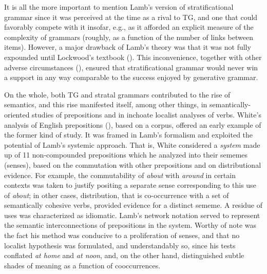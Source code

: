 \documentclass[english,output=paper,colorlinks,citecolor=brown]{../langscibook}
\begin{document}
It is all the more important to mention Lamb’s version of stratificational grammar since it was perceived at the time as a rival to TG, and one that could favorably compete with it insofar, e.g., as it afforded an explicit measure of the complexity of grammars (roughly, as a function of the number of links between items). However, a major drawback of Lamb’s theory was that it was not fully expounded until Lockwood’s textbook (\citealt{Lockwood1972}). This inconvenience, together with other adverse circumstances (\citealt{Nielsen2010}), ensured that stratificational grammar would never win a support in any way comparable to the success enjoyed by generative grammar.

On the whole, both TG and stratal grammars contributed to the rise of semantics, and this rise manifested itself, among other things, in semantically-oriented studies of prepositions and in inchoate localist analyses of verbs. White’s analysis of English prepositions (\citealt{White1964}), based on a corpus, offered an early example of the former kind of study. It was framed in Lamb’s formalism and exploited the potential of Lamb’s systemic approach. That is, White considered a \textit{system} made up of 11 non-compounded prepositions which he analyzed into their sememes (senses), based on the commutation with other prepositions and on distributional evidence. For example, the commutability of \textit{about} with \textit{around} in certain contexts was taken to justify positing a separate sense corresponding to this use of \textit{about}; in other cases, distribution, that is co-occurrence with a set of semantically cohesive verbs, provided evidence for a distinct sememe. A residue of uses was characterized as idiomatic. Lamb’s network notation served to represent the semantic interconnections of prepositions in the system. Worthy of note was the fact his method was conducive to a proliferation of senses, and that no localist hypothesis was formulated, and understandably so, since his tests conflated \textit{at home} and \textit{at noon}, and, on the other hand, distinguished subtle shades of meaning as a function of cooccurrences.
\end{document}

